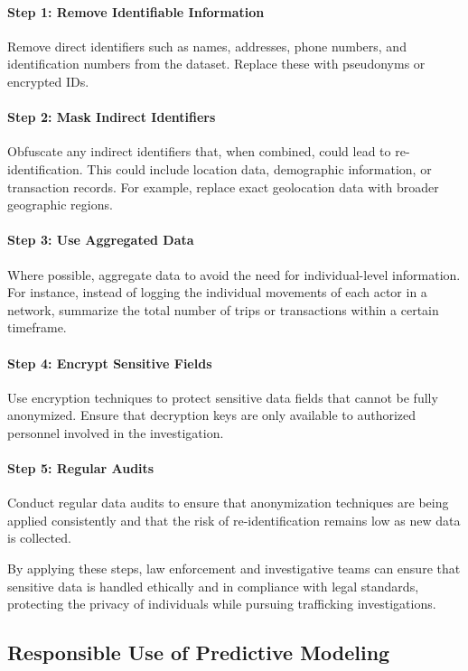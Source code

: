 \documentclass[%
 preprint, linenumbers,
 amsmath,amssymb,
 aps, physrev,
]{revtex4-2}
\begin{document}
\paragraph{Step 1: Remove Identifiable Information}
Remove direct identifiers such as names, addresses, phone numbers, and identification numbers from the dataset. Replace these with pseudonyms or encrypted IDs.

\paragraph{Step 2: Mask Indirect Identifiers}
Obfuscate any indirect identifiers that, when combined, could lead to re-identification. This could include location data, demographic information, or transaction records. For example, replace exact geolocation data with broader geographic regions.

\paragraph{Step 3: Use Aggregated Data}
Where possible, aggregate data to avoid the need for individual-level information. For instance, instead of logging the individual movements of each actor in a network, summarize the total number of trips or transactions within a certain timeframe.

\paragraph{Step 4: Encrypt Sensitive Fields}
Use encryption techniques to protect sensitive data fields that cannot be fully anonymized. Ensure that decryption keys are only available to authorized personnel involved in the investigation.

\paragraph{Step 5: Regular Audits}
Conduct regular data audits to ensure that anonymization techniques are being applied consistently and that the risk of re-identification remains low as new data is collected.

By applying these steps, law enforcement and investigative teams can ensure that sensitive data is handled ethically and in compliance with legal standards, protecting the privacy of individuals while pursuing trafficking investigations.

\subsection{Responsible Use of Predictive Modeling}
\end{document}
